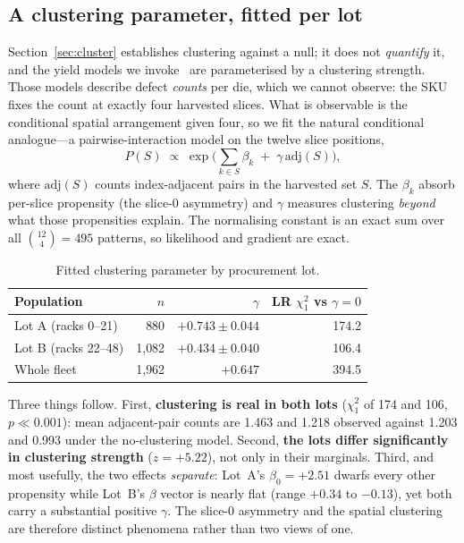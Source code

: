 \documentclass[10pt,conference]{IEEEtran}
\begin{document}
\subsection{A clustering parameter, fitted per lot}
\label{sec:yield}
Section~\ref{sec:cluster} establishes clustering against a null; it does not \emph{quantify} it,
and the yield models we invoke~\cite{koren1993negbinom,bae2007waferyield} are parameterised by a
clustering strength. Those models describe defect \emph{counts} per die, which we cannot observe:
the SKU fixes the count at exactly four harvested slices. What is observable is the conditional
spatial arrangement given four, so we fit the natural conditional analogue---a pairwise-interaction
model on the twelve slice positions,
\[
  P(S)\;\propto\;\exp\Big(\textstyle\sum_{k\in S}\beta_k \;+\; \gamma\,\mathrm{adj}(S)\Big),
\]
where $\mathrm{adj}(S)$ counts index-adjacent pairs in the harvested set $S$. The $\beta_k$ absorb
per-slice propensity (the slice-0 asymmetry) and $\gamma$ measures clustering \emph{beyond} what
those propensities explain. The normalising constant is an exact sum over all
$\binom{12}{4}=495$ patterns, so likelihood and gradient are exact.

\begin{table}[h]\centering\caption{Fitted clustering parameter by procurement lot.}
\label{tab:yield}
\begin{tabular}{lrrr}\toprule
Population & $n$ & $\gamma$ & LR $\chi^2_1$ vs $\gamma{=}0$\\\midrule
Lot A (racks 0--21)  & 880 & $+0.743\pm0.044$ & 174.2\\
Lot B (racks 22--48) & 1{,}082 & $+0.434\pm0.040$ & 106.4\\
Whole fleet          & 1{,}962 & $+0.647$ & 394.5\\
\bottomrule\end{tabular}\end{table}

Three things follow. First, \textbf{clustering is real in both lots} ($\chi^2_1$ of 174 and 106,
$p\ll0.001$): mean adjacent-pair counts are 1.463 and 1.218 observed against 1.203 and 0.993 under
the no-clustering model. Second, \textbf{the lots differ significantly in clustering strength}
($z=+5.22$), not only in their marginals. Third, and most usefully, the two effects
\emph{separate}: Lot~A's $\beta_0=+2.51$ dwarfs every other propensity while Lot~B's $\beta$ vector
is nearly flat (range $+0.34$ to $-0.13$), yet both carry a substantial positive $\gamma$. The
slice-0 asymmetry and the spatial clustering are therefore distinct phenomena rather than two
views of one.
\end{document}
